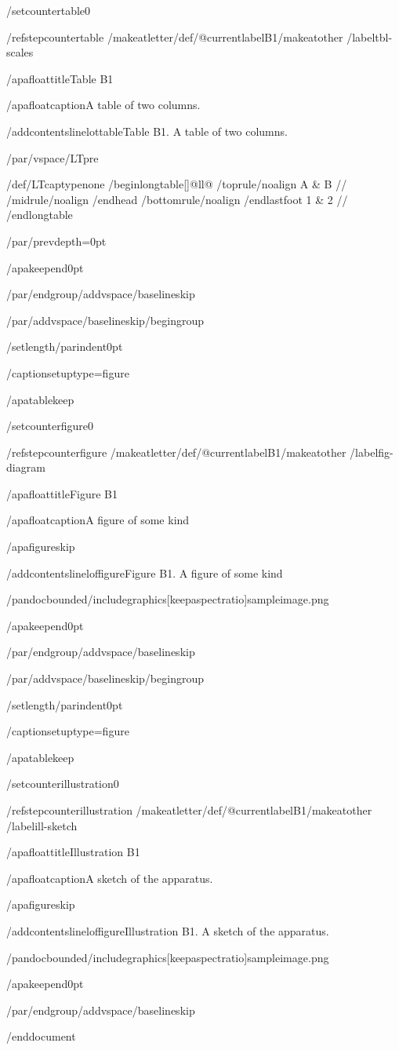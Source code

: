 /setcounter{table}{0}

/refstepcounter{table}%
/makeatletter/def/@currentlabel{B1}/makeatother%
/label{tbl-scales}

/apafloattitle{Table B1}

/apafloatcaption{A table of two columns.}

/addcontentsline{lot}{table}{Table B1. A table of two columns.}

/par/vspace{/LTpre}

{/def/LTcaptype{none} %
/begin{longtable}[]{@{}ll@{}}
/toprule/noalign{}
A & B //
/midrule/noalign{}
/endhead
/bottomrule/noalign{}
/endlastfoot
1 & 2 //
/end{longtable}
}

/par/prevdepth=0pt

/apakeepend{0pt}

/par/endgroup/addvspace{/baselineskip}

/par/addvspace{/baselineskip}/begingroup

/setlength{/parindent}{0pt}

/captionsetup{type=figure}

/apatablekeep

/setcounter{figure}{0}

/refstepcounter{figure}%
/makeatletter/def/@currentlabel{B1}/makeatother%
/label{fig-diagram}

/apafloattitle{Figure B1}

/apafloatcaption{A figure of some kind}

/apafigureskip

/addcontentsline{lof}{figure}{Figure B1. A figure of some kind}

/pandocbounded{/includegraphics[keepaspectratio]{sampleimage.png}}

/apakeepend{0pt}

/par/endgroup/addvspace{/baselineskip}

/par/addvspace{/baselineskip}/begingroup

/setlength{/parindent}{0pt}

/captionsetup{type=figure}

/apatablekeep

/setcounter{illustration}{0}

/refstepcounter{illustration}%
/makeatletter/def/@currentlabel{B1}/makeatother%
/label{ill-sketch}

/apafloattitle{Illustration B1}

/apafloatcaption{A sketch of the apparatus.}

/apafigureskip

/addcontentsline{lof}{figure}{Illustration B1. A sketch of the
apparatus.}

/pandocbounded{/includegraphics[keepaspectratio]{sampleimage.png}}

/apakeepend{0pt}

/par/endgroup/addvspace{/baselineskip}




/end{document}
